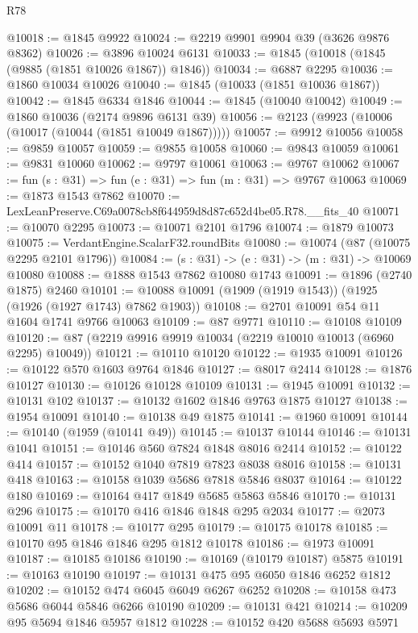 \begin{lexlean}{R78}
\begin{coremodule}
@10018 := @1845 @9922
@10024 := @2219 @9901 @9904 @39 (@3626 @9876 @8362)
@10026 := @3896 @10024 @6131
@10033 := @1845 (@10018 (@1845 (@9885 (@1851 @10026 @1867)) @1846))
@10034 := @6887 @2295
@10036 := @1860 @10034 @10026
@10040 := @1845 (@10033 (@1851 @10036 @1867))
@10042 := @1845 @6334 @1846
@10044 := @1845 (@10040 @10042)
@10049 := @1860 @10036 (@2174 @9896 @6131 @39)
@10056 := @2123 (@9923 (@10006 (@10017 (@10044 (@1851 @10049 @1867)))))
@10057 := @9912 @10056
@10058 := @9859 @10057
@10059 := @9855 @10058
@10060 := @9843 @10059
@10061 := @9831 @10060
@10062 := @9797 @10061
@10063 := @9767 @10062
@10067 := fun (s : @31) => fun (e : @31) => fun (m : @31) => @9767 @10063
@10069 := @1873 @1543 @7862
@10070 := LexLeanPreserve.C69a0078cb8f644959d8d87c652d4be05.R78.__fits_40
@10071 := @10070 @2295
@10073 := @10071 @2101 @1796
@10074 := @1879 @10073
@10075 := VerdantEngine.ScalarF32.roundBits
@10080 := @10074 (@87 (@10075 @2295 @2101 @1796))
@10084 := (s : @31) -> (e : @31) -> (m : @31) -> @10069 @10080
@10088 := @1888 @1543 @7862 @10080 @1743
@10091 := @1896 (@2740 @1875) @2460
@10101 := @10088 @10091 (@1909 (@1919 @1543)) (@1925 (@1926 (@1927 @1743) @7862 @1903))
@10108 := @2701 @10091 @54 @11 @1604 @1741 @9766 @10063
@10109 := @87 @9771
@10110 := @10108 @10109
@10120 := @87 (@2219 @9916 @9919 @10034 (@2219 @10010 @10013 (@6960 @2295) @10049))
@10121 := @10110 @10120
@10122 := @1935 @10091
@10126 := @10122 @570 @1603 @9764 @1846
@10127 := @8017 @2414
@10128 := @1876 @10127
@10130 := @10126 @10128 @10109
@10131 := @1945 @10091
@10132 := @10131 @102
@10137 := @10132 @1602 @1846 @9763 @1875 @10127
@10138 := @1954 @10091
@10140 := @10138 @49 @1875
@10141 := @1960 @10091
@10144 := @10140 (@1959 (@10141 @49))
@10145 := @10137 @10144
@10146 := @10131 @1041
@10151 := @10146 @560 @7824 @1848 @8016 @2414
@10152 := @10122 @414
@10157 := @10152 @1040 @7819 @7823 @8038 @8016
@10158 := @10131 @418
@10163 := @10158 @1039 @5686 @7818 @5846 @8037
@10164 := @10122 @180
@10169 := @10164 @417 @1849 @5685 @5863 @5846
@10170 := @10131 @296
@10175 := @10170 @416 @1846 @1848 @295 @2034
@10177 := @2073 @10091 @11
@10178 := @10177 @295
@10179 := @10175 @10178
@10185 := @10170 @95 @1846 @1846 @295 @1812 @10178
@10186 := @1973 @10091
@10187 := @10185 @10186
@10190 := @10169 (@10179 @10187) @5875
@10191 := @10163 @10190
@10197 := @10131 @475 @95 @6050 @1846 @6252 @1812
@10202 := @10152 @474 @6045 @6049 @6267 @6252
@10208 := @10158 @473 @5686 @6044 @5846 @6266 @10190
@10209 := @10131 @421
@10214 := @10209 @95 @5694 @1846 @5957 @1812
@10228 := @10152
    @420
    @5688
    @5693
    @5971

\end{coremodule}
\end{lexlean}
